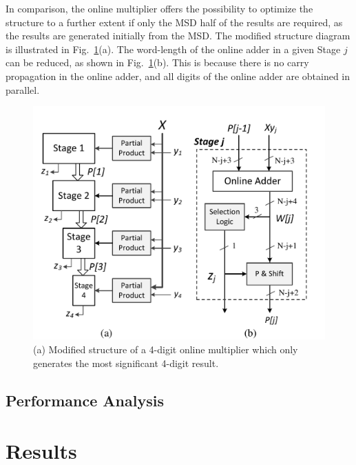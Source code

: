 \documentclass[conference]{IEEEtran}
\begin{document}
In comparison, the online multiplier offers the possibility to optimize the structure to a further extent if only the MSD half of the results are required, as the results are generated initially from the MSD. The modified structure diagram is illustrated in Fig.~\ref{Fig:PMStructure_MSDhalf}(a). The word-length of the online adder in a given Stage $j$ can be reduced, as shown in Fig.~\ref{Fig:PMStructure_MSDhalf}(b). This is because there is no carry propagation in the online adder, and all digits of the online adder are obtained in parallel.

\begin{figure}[tbp]
	\centering
	\includegraphics[width=.5\textwidth]{./Figures/ParallelMult_MSDhalf.pdf}
	\caption{(a) Modified structure of a 4-digit online multiplier which only generates the most significant 4-digit result. }
	\label{Fig:PMStructure_MSDhalf}
\end{figure}

\subsection{Performance Analysis}


\section{Results}





%
%
\end{document}
